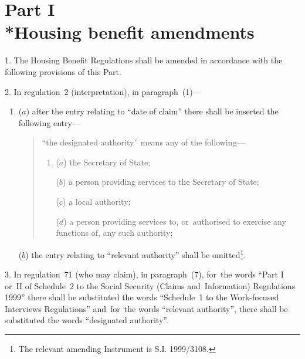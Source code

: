 \documentclass[12pt,a4paper]{article}
\begin{document}
\section[Part I --- Housing benefit amendments]{Part I\\*Housing benefit amendments}

\renewcommand\parthead{--- Schedule~4 Part I}

1.  The Housing Benefit Regulations shall be amended in accordance with the following provisions of this Part.

\medskip

2.  In regulation~2 (interpretation), in paragraph~(1)—
\begin{enumerate}\item[]
($a$) after the entry relating to “date of claim” there shall be inserted the following entry—
\begin{quotation}
    “the designated authority” means any of the following—
\begin{enumerate}\item[]
    ($a$) 
    the Secretary of State;

    ($b$) 
    a person providing services to the Secretary of State;

    ($c$) 
    a local authority;

    ($d$) 
    a person providing services to, or~authorised to exercise any functions of, any such authority;
\end{enumerate}
\end{quotation}

    ($b$) 
    the entry relating to “relevant authority” shall be omitted\footnote{\frenchspacing The relevant amending Instrument is S.I. 1999/3108.\label{fn:18}}. 
\end{enumerate}

\medskip

3.  In regulation~71 (who may claim), in paragraph~(7), for~the words “Part I or~II of Schedule~2 to the Social Security (Claims and~Information) Regulations 1999” there shall be substituted the words “Schedule~1 to the Work-focused Interviews Regulations” and~for~the words “relevant authority”, there shall be substituted the words “designated authority”.

\medskip
\end{document}
